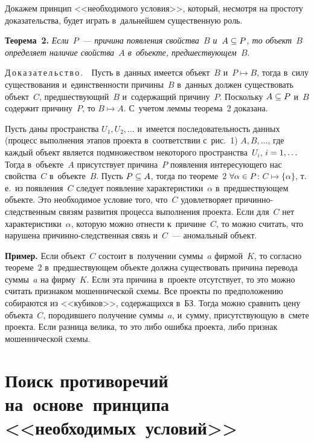 \begin{multicols}{2}
  Докажем принцип <<необходимого условия>>, который, несмотря на простоту 
доказательства, будет играть в~дальнейшем существенную роль.
  
  \smallskip
  
  \noindent
  \textbf{Теорема~2.} \textit{Если~$P$~--- причина появления свойства~$B$ 
и~$A\hm\subseteq P$, то объект~$B$ определяет наличие свойства~$A$ 
в~объекте, предшествующем~$B$}. 
  
  \smallskip
  
  \noindent
  Д\,о\,к\,а\,з\,а\,т\,е\,л\,ь\,с\,т\,в\,о\,.\ \ Пусть в~данных имеется объект~$B$ 
и~$P\mapsto B$, тогда в~силу существования и~единственности причины~$B$ 
в~данных должен существовать объект~$C$, предшествующий~$B$ 
и~содержащий причину~$P$. Поскольку $A\hm\subseteq P$ и~$B$ содержит 
причину~$P$, то $B\mapsto A$. С~учетом леммы теорема~2 доказана.
  
  \smallskip
  
  Пусть даны пространства $U_1, U_2,\ldots$ и~имеется последовательность 
данных (процесс выполнения этапов проекта в~соответствии с~рис.~1) $A, B, 
\ldots$, где каждый объект является подмножеством некоторого 
пространства~$U_i$, $i\hm=1,\ldots$ Тогда в~объекте~$A$ присутствует 
причина~$P$ появления интересующего нас свойства~$C$ в~объекте~$B$. Пусть 
$P\hm\subseteq A$, тогда по теореме~2 $\forall \alpha\hm\in P$:  
$C\mapsto \{\alpha\}$, т.\,е.\ из появления~$C$ следует появление 
характеристики~$\alpha$ в~предшествующем объекте. Это необходимое условие 
того, что~$C$ удовлетворяет причинно-следственным связям развития процесса 
выполнения проекта. Если для~$C$ нет характеристики~$\alpha$, которую можно 
отнести к~причине~$C$, то можно считать, что нарушена  
при\-чин\-но-след\-ст\-вен\-ная связь и~$C$~--- аномальный объект. 
  
  \smallskip
  
  \noindent
  \textbf{Пример.} Если объект~$C$ состоит в~получении суммы~$a$ 
фирмой~$K$, то согласно теореме~2 в~пред\-шест\-ву\-ющем объекте должна 
существовать причина перевода суммы~$a$ на фирму~$K$. Если эта причина 
в~проекте отсутствует, то это можно считать признаком мошеннической схемы. 
Все проекты по предположению собираются из <<кубиков>>, содержащихся в~БЗ. 
Тогда можно сравнить цену объекта~$C$, породившего получение суммы~$a$, 
и~сумму, присутствующую в~смете проекта. Если разница велика, то это либо 
ошибка проекта, либо признак мошеннической схемы.
  
  \section{Поиск противоречий на~основе~принципа <<необходимых~условий>>}
   

\end{multicols}
